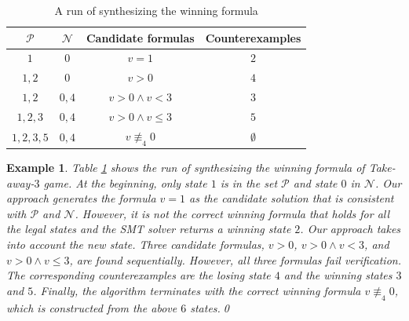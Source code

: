 \documentclass[review]{elsarticle}
\newcommand{\tuple}[1]{\langle {#1} \rangle}
\newcommand{\statevar}{\mathcal{X}}
\newcommand{\positiveSet}{\mathcal{P}}
\newcommand{\negativeSet}{\mathcal{N}}
\newcommand{\act}{\mathcal{A}}
\newcommand{\constraint}{\mathcal{C}}
\newcommand{\estate}{\mathcal{E}}
\newcommand{\nmodulo}{\not \equiv}
\newtheorem{example}{Example}
\newtheorem{theorem}{Theorem}
\begin{document}
        
        \begin{table}[!t]        	
		\small
        \centering        	
        	\begin{tabular}{|c|c|c|c|}
        		\hline
        		$\positiveSet$ & $\negativeSet$ & Candidate formulas & Counterexamples \\ \hline
        		$1$ & $0$ & $v = 1$ & $2$ \\ \hline
        		$1, 2$ & $0$ & $v > 0$ & $4$ \\ \hline
        		$1, 2$ & $0,4$ & $v > 0 \land v < 3$ & $3$\\ \hline
        		$1, 2, 3$ & $0,4$ & $v > 0 \land v \leq 3$ & $5$\\ \hline
				$1, 2, 3, 5$ & $0,4$ & $v \nmodulo_4 0$ & $\emptyset$\\ \hline
        	\end{tabular}
        	\caption{A run of synthesizing the winning formula}
        	\label{table:synWinForm}
        \end{table}

%    	
%
    
        \begin{example} \label{exm:synWinForm} \rm 
        Table \ref{table:synWinForm} shows the run of synthesizing the winning formula of Take-away-$3$ game.
        At the beginning, only state $1$ is in the set $\positiveSet$ and state $0$ in $\negativeSet$.
		Our approach generates the formula $v = 1$ as the candidate solution that is consistent with $\positiveSet$ and $\negativeSet$.
		However, it is not the correct winning formula that holds for all the legal states and the SMT solver returns a winning state $2$.
		Our approach takes into account the new state.
		{\color{red}Three candidate formulas, $v > 0$, $v > 0  \land  v < 3$, and $v > 0 \land v \leq 3$, are found sequentially.}
		{\color{red}However, all three formulas fail verification. The corresponding counterexamples are the losing state $4$ and the winning states $3$ and $5$.}
        Finally, the algorithm terminates with the correct winning formula $v \nmodulo_4 0$, which is constructed from the above {\color{red}$6$} states.\qed
        \end{example}
        
\end{document}
